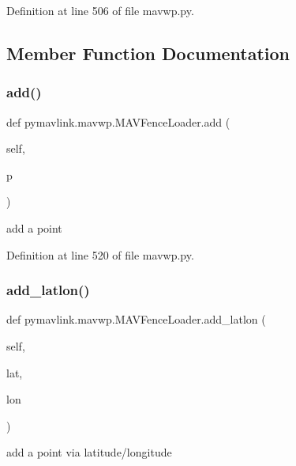 Definition at line 506 of file mavwp.\+py.



\subsection{Member Function Documentation}
\mbox{\label{classpymavlink_1_1mavwp_1_1MAVFenceLoader_a58e43bc724a67d155e5746e7abf3d31e}} 
\subsubsection{\texorpdfstring{add()}{add()}}
{\footnotesize\ttfamily def pymavlink.\+mavwp.\+M\+A\+V\+Fence\+Loader.\+add (\begin{DoxyParamCaption}\item[{}]{self,  }\item[{}]{p }\end{DoxyParamCaption})}

\begin{DoxyVerb}add a point\end{DoxyVerb}
 

Definition at line 520 of file mavwp.\+py.

\mbox{\label{classpymavlink_1_1mavwp_1_1MAVFenceLoader_adfb4b572f7ecfa4bee52c3f62e42915f}} 
\subsubsection{\texorpdfstring{add\_latlon()}{add\_latlon()}}
{\footnotesize\ttfamily def pymavlink.\+mavwp.\+M\+A\+V\+Fence\+Loader.\+add\+\_\+latlon (\begin{DoxyParamCaption}\item[{}]{self,  }\item[{}]{lat,  }\item[{}]{lon }\end{DoxyParamCaption})}

\begin{DoxyVerb}add a point via latitude/longitude\end{DoxyVerb}
 

